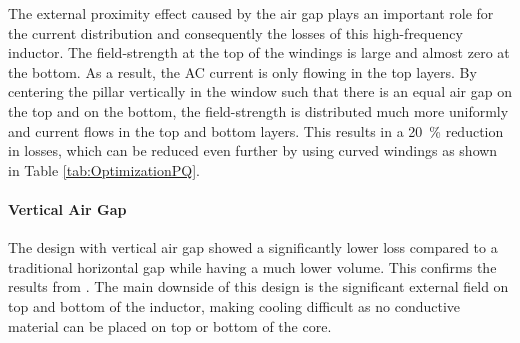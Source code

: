 \documentclass{IPEC2026}
\newcommand{\sbl}[1]{\glssymbol{#1}}
\newcommand{\ac}{\gls}
\begin{document}
The external proximity effect caused by the air gap plays an important role for the current distribution and consequently the losses of this high-frequency inductor. The field-strength at the top of the windings is large and almost zero at the bottom. As a result, the AC current is only flowing in the top layers. By centering the pillar vertically in the window such that there is an equal air gap on the top and on the bottom, the field-strength is distributed much more uniformly and current flows in the top and bottom layers. This results in a \qty{20}{\percent} reduction in losses, which can be reduced even further by using curved windings as shown in Table \ref{tab:OptimizationPQ}.


%   

\paragraph{Vertical Air Gap}
The design with vertical air gap showed a significantly lower loss compared to a traditional horizontal gap while having a much lower volume. This confirms the results from \cite{schaferNovelHighlyEfficient2020}. The main downside of this design is the significant external field on top and bottom of the inductor, making cooling difficult as no conductive material can be placed on top or bottom of the core. %
\end{document}
